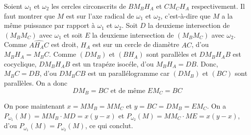 \begin{sol}
\begin{center}
\end{center}

Soient $\omega_1$ et $\omega_2$ les cercles circonscrits de $B M_B H_A$ et $C M_C H_A$ respectivement. Il faut montrer que $M$ est sur l'axe radical de $\omega_1$ et $\omega_2$, c'est-à-dire que $M$ a la même puissance par rapport à $\omega_1$ et $\omega_2$. Soit $D$ la deuxieme intersection de $\left(M_B M_C\right)$ avec $\omega_1$ et soit $E$ la deuxieme intersection de $\left(M_B M_C\right)$ avec $\omega_2$. Comme $\widehat{A H_A C}$ est droit, $H_A$ est sur un cercle de diamètre $AC$, d'ou $M_B H_A = M_B C$. Comme $\left(D M_B\right)$ et $\left(B H_A\right)$ sont parallèles et $D M_B H_A B$ est cocyclique, $D M_B H_A B$ est un trapéze isocéle, d'ou $M_B H_A = DB$. Donc, $M_B C = DB$, d'ou $D M_B C B$ est un parallélogramme car $\left(D M_B\right)$ et $\left(B C\right)$ sont parallèles. On a donc
$$D M_B = BC\text{ et de même } E M_C = BC$$

On pose maintenant $x = M M_B = M M_C$ et $y = B C = D M_B = E M_C$. On a $P_{\omega_1} \left(M\right) = M M_B \cdot M D = x \left(y - x\right)$ et $P_{\omega_2} \left(M\right) = M M_C \cdot M E = x \left(y - x\right)$, d'ou $P_{\omega_1} \left(M\right) = P_{\omega_2} \left(M\right)$, ce qui conclut.
\end{sol}


